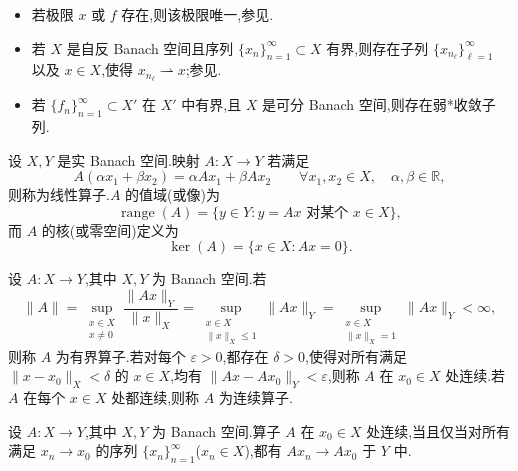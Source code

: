 \begin{note}[弱收敛与弱*收敛]\label{note:appendix-a-58}
\begin{itemize}
 \item 若极限 $x$ 或 $f$ 存在,则该极限唯一,参见\textcite[第 120 页]{Yosida1995}.
 \item 若 $X$ 是自反 Banach 空间且序列 $\{x_n\}_{n=1}^{\infty}\subset X$ 有界,则存在子列 $\{x_{n_\ell}\}_{\ell=1}^{\infty}$ 以及 $x\in X$,使得 $x_{n_\ell}\rightharpoonup x$;参见\textcite[第 723 页]{Evans2010}.
 \item 若 $\{f_n\}_{n=1}^{\infty}\subset X'$ 在 $X'$ 中有界,且 $X$ 是可分 Banach 空间,则存在弱*收敛子列.
\end{itemize}
\end{note}

\begin{definition}\label{def:appendix-a-59}
设 $X,Y$ 是实 Banach 空间.映射 $A:X\to Y$ 若满足
\[
 A(\alpha x_1+\beta x_2)=\alpha Ax_1+\beta Ax_2
 \qquad\forall x_1,x_2\in X,\quad \alpha,\beta\in\mathbb R,
\]
则称为线性算子.$A$ 的值域(或像)为
\[
 \operatorname{range}(A)=\{y\in Y:y=Ax\text{ 对某个 }x\in X\},
\]
而 $A$ 的核(或零空间)定义为
\[
 \ker(A)=\{x\in X:Ax=0\}.
\]
\end{definition}

\begin{definition}[有界算子与连续算子]\label{def:appendix-a-60}
设 $A:X\to Y$,其中 $X,Y$ 为 Banach 空间.若
\begin{equation}\label{eq:appendix-a-46}
 \|A\|=\sup_{\substack{x\in X\\x\ne0}}\frac{\|Ax\|_Y}{\|x\|_X}
 =\sup_{\substack{x\in X\\\|x\|_X\le1}}\|Ax\|_Y
 =\sup_{\substack{x\in X\\\|x\|_X=1}}\|Ax\|_Y<\infty,
\end{equation}
则称 $A$ 为有界算子.若对每个 $\varepsilon>0$,都存在 $\delta>0$,使得对所有满足 $\|x-x_0\|_X<\delta$ 的 $x\in X$,均有 $\|Ax-Ax_0\|_Y<\varepsilon$,则称 $A$ 在 $x_0\in X$ 处连续.若 $A$ 在每个 $x\in X$ 处都连续,则称 $A$ 为连续算子.
\end{definition}

\begin{note}[连续算子的等价定义]\label{note:appendix-a-61}
设 $A:X\to Y$,其中 $X,Y$ 为 Banach 空间.算子 $A$ 在 $x_0\in X$ 处连续,当且仅当对所有满足 $x_n\to x_0$ 的序列 $\{x_n\}_{n=1}^{\infty}$($x_n\in X$),都有 $Ax_n\to Ax_0$ 于 $Y$ 中.
\end{note}

